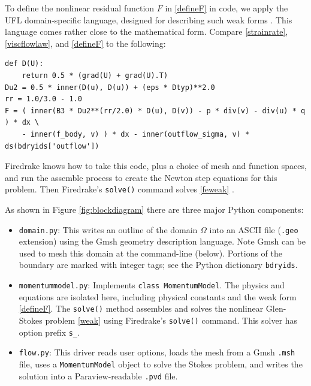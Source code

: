 \documentclass[letterpaper,final,12pt,reqno]{amsart}
\begin{document}
To define the nonlinear residual function $F$ in \eqref{defineF} in code, we apply the UFL domain-specific language, designed for describing such weak forms \cite{Alnaesetal2014}.  This language comes rather close to the mathematical form.  Compare \eqref{strainrate}, \eqref{viscflowlaw}, and \eqref{defineF} to the following:
\begin{Verbatim}[fontsize=\small,frame=lines]
def D(U):
    return 0.5 * (grad(U) + grad(U).T)
Du2 = 0.5 * inner(D(u), D(u)) + (eps * Dtyp)**2.0
rr = 1.0/3.0 - 1.0
F = ( inner(B3 * Du2**(rr/2.0) * D(u), D(v)) - p * div(v) - div(u) * q ) * dx \
    - inner(f_body, v) ) * dx - inner(outflow_sigma, v) * ds(bdryids['outflow'])
\end{Verbatim}
Firedrake knows how to take this code, plus a choice of mesh and function spaces, and run the assemble process to create the Newton step equations for this problem.  Then Firedrake's \texttt{solve()} command solves \eqref{feweak} \cite{Rathgeberetal2016}.

\medskip
As shown in Figure \ref{fig:blockdiagram} there are three major Python components:
\begin{itemize}
\item \texttt{domain.py}: \quad  This writes an outline of the domain $\Omega$ into an ASCII file (\texttt{.geo} extension) using the Gmsh \cite{GeuzaineRemacle2009} geometry description language.  Note Gmsh can be used to mesh this domain at the command-line (below).  Portions of the boundary are marked with integer tags; see the Python dictionary \texttt{bdryids}.

\item \texttt{momentummodel.py}: \quad  Implements \texttt{class MomentumModel}.  The physics and equations are isolated here, including physical constants and the weak form \eqref{defineF}.  The \texttt{solve()} method assembles and solves the nonlinear Glen-Stokes problem \eqref{weak} using Firedrake's \texttt{solve()} command.  This solver has option prefix \texttt{s\_}.

\item \texttt{flow.py}: \quad  This driver reads user options, loads the mesh from a Gmsh \texttt{.msh} file, uses a \texttt{MomentumModel} object to solve the Stokes problem, and writes the solution into a Paraview-readable \texttt{.pvd} file.
\end{itemize}
\end{document}
